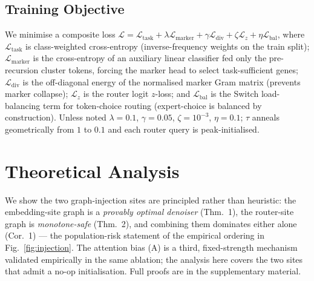 \documentclass[letterpaper]{article}
\begin{document}
\subsection{Training Objective}
We minimise a composite loss
$\mathcal{L} = \mathcal{L}_{\mathrm{task}} + \lambda\mathcal{L}_{\mathrm{marker}}
+ \gamma\mathcal{L}_{\mathrm{div}} + \zeta\mathcal{L}_{z} + \eta\mathcal{L}_{\mathrm{bal}}$,
where $\mathcal{L}_{\mathrm{task}}$ is class-weighted cross-entropy (inverse-frequency
weights on the train split); $\mathcal{L}_{\mathrm{marker}}$ is the cross-entropy of
an auxiliary linear classifier fed only the pre-recursion cluster tokens, forcing the
marker head to select task-sufficient genes;
$\mathcal{L}_{\mathrm{div}}$ is the off-diagonal energy of the normalised marker Gram
matrix (prevents marker collapse); $\mathcal{L}_{z}$ is the router logit $z$-loss; and
$\mathcal{L}_{\mathrm{bal}}$ is the Switch load-balancing term
\cite{shazeer2017outrageously} for token-choice routing (expert-choice is balanced by
construction). Unless noted $\lambda{=}0.1$, $\gamma{=}0.05$, $\zeta{=}10^{-3}$,
$\eta{=}0.1$; $\tau$ anneals geometrically from $1$ to $0.1$ and each router query is
peak-initialised.

\section{Theoretical Analysis}
\label{sec:theory}
We show the two graph-injection sites are principled rather than heuristic: the embedding-site graph
is a \emph{provably optimal denoiser} (Thm.~1), the router-site graph is \emph{monotone-safe}
(Thm.~2), and combining them dominates either alone (Cor.~1) --- the population-risk statement
of the empirical ordering in Fig.~\ref{fig:injection}. The attention bias (A) is a third,
fixed-strength mechanism validated empirically in the same ablation; the analysis here covers the
two sites that admit a no-op initialisation. Full proofs are in the supplementary
material.

\begin{table}[!b]
\centering
{}
\caption{\textbf{Main results: the efficiency ladder (5-fold CV).} Macro-F1 mean$\pm$SD; the
\colorbox{bestgreen}{best per column} is highlighted; Avg is over all $14$ datasets. The
weight-shared adaptive-recursion backbone (Recursive, MoR) matches the vanilla transformer at
$4\times$ fewer parameters; the accuracy gain arrives only with our learned interaction graph
(bioMoR), at the same parameter and FLOP budget. Multi-omics columns: Prostate, Bladder, Stomach are the Reactome multi-omics cancer cohorts; Pan-MC, Pan-Ex, Pan-3M are pan-cancer with mutation$+$CNV, expression, and tri-modal (all three) inputs.}
\label{tab:main_cv5}\label{tab:learned}\label{tab:ladder}
\end{table}
\end{document}
